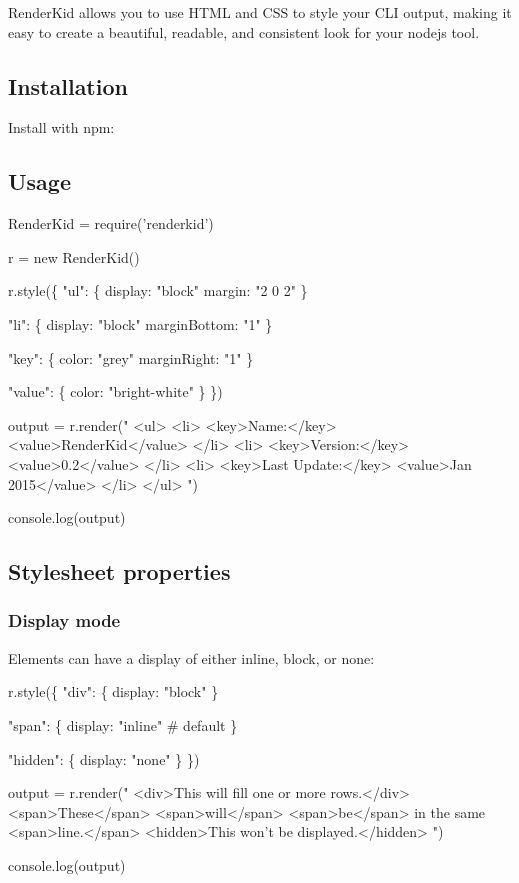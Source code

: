 \href{http://travis-ci.org/AriaMinaei/RenderKid}{\tt }

Render\+Kid allows you to use H\+T\+ML and C\+SS to style your C\+LI output, making it easy to create a beautiful, readable, and consistent look for your nodejs tool.

\subsection*{Installation}

Install with npm\+: 


\subsection*{Usage}


\begin{DoxyCode}
RenderKid = require('renderkid')

r = new RenderKid()

r.style(\{
  "ul": \{
    display: "block"
    margin: "2 0 2"
  \}

  "li": \{
    display: "block"
    marginBottom: "1"
  \}

  "key": \{
    color: "grey"
    marginRight: "1"
  \}

  "value": \{
    color: "bright-white"
  \}
\})

output = r.render("
<ul>
  <li>
    <key>Name:</key>
    <value>RenderKid</value>
  </li>
  <li>
    <key>Version:</key>
    <value>0.2</value>
  </li>
  <li>
    <key>Last Update:</key>
    <value>Jan 2015</value>
  </li>
</ul>
")

console.log(output)
\end{DoxyCode}




\subsection*{Stylesheet properties}

\subsubsection*{Display mode}

Elements can have a {\ttfamily display} of either {\ttfamily inline}, {\ttfamily block}, or {\ttfamily none}\+: 
\begin{DoxyCode}
r.style(\{
  "div": \{
    display: "block"
  \}

  "span": \{
    display: "inline" # default
  \}

  "hidden": \{
    display: "none"
  \}
\})

output = r.render("
<div>This will fill one or more rows.</div>
<span>These</span> <span>will</span> <span>be</span> in the same <span>line.</span>
<hidden>This won't be displayed.</hidden>
")

console.log(output)
\end{DoxyCode}




